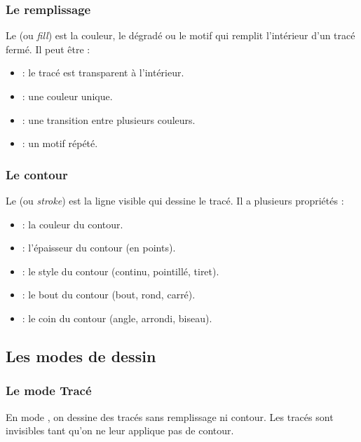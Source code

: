 \subsubsection{Le remplissage}

Le  (ou \emph{fill}) est la couleur, le dégradé ou le motif qui remplit l'intérieur d'un tracé fermé. Il peut être :

\begin{itemize}
    \item {} : le tracé est transparent à l'intérieur.
    \item {} : une couleur unique.
    \item {} : une transition entre plusieurs couleurs.
    \item {} : un motif répété.
\end{itemize}

\subsubsection{Le contour}

Le  (ou \emph{stroke}) est la ligne visible qui dessine le tracé. Il a plusieurs propriétés :

\begin{itemize}
    \item {} : la couleur du contour.
    \item {} : l'épaisseur du contour (en points).
    \item {} : le style du contour (continu, pointillé, tiret).
    \item {} : le bout du contour (bout, rond, carré).
    \item {} : le coin du contour (angle, arrondi, biseau).
\end{itemize}

\subsection{Les modes de dessin}

\subsubsection{Le mode Tracé}

En mode , on dessine des tracés sans remplissage ni contour. Les tracés sont invisibles tant qu'on ne leur applique pas de contour.

